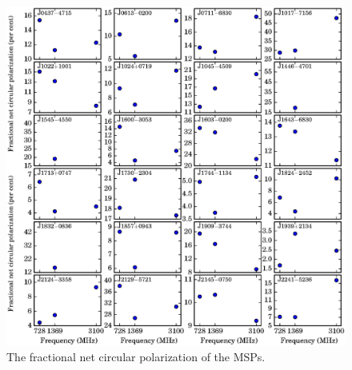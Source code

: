 \documentclass[useAMS,usenatbib]{mn2e}
\begin{document}
\begin{figure}
\begin{center}
\includegraphics[width=6 in]{fabsCircular.ps}
\caption{The fractional net circular polarization of the MSPs.} 
\label{fabsCircular}
\end{center}
\end{figure}
\end{document}
